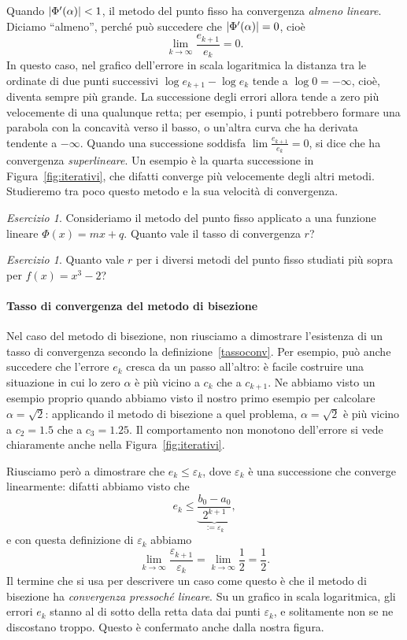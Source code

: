 \documentclass[a4paper]{report}
\DeclarePairedDelimiter{\abs}{\lvert}{\rvert}
\theoremstyle{definition}
\theoremstyle{remark}
\newtheorem{esercizio}[theorem]{Esercizio}
\begin{document}
Quando $\abs{\Phi'(\alpha)}<1$, il metodo del punto fisso ha convergenza \emph{almeno lineare}. Diciamo ``almeno'', perché può succedere che $\abs{\Phi'(\alpha)} = 0$, cioè
\[
    \lim_{k\to\infty} \frac{e_{k+1}}{e_k} = 0.
\]
In questo caso, nel grafico dell'errore in scala logaritmica la distanza tra le ordinate di due punti successivi $\log e_{k+1} - \log e_k$ tende a $\log 0 = -\infty$, cioè, diventa sempre più grande. La successione degli errori allora tende a zero più velocemente di una qualunque retta; per esempio, i punti potrebbero formare una parabola con la concavità verso il basso, o un'altra curva che ha derivata tendente a $-\infty$. Quando una successione soddisfa $\lim \frac{e_{k+1}}{e_k} = 0$, si dice che ha convergenza \emph{superlineare}. Un esempio è la quarta successione in Figura~\ref{fig:iterativi}, che difatti converge più velocemente degli altri metodi. Studieremo tra poco questo metodo e la sua velocità di convergenza.

\begin{esercizio}
    Consideriamo il metodo del punto fisso applicato a una funzione lineare $\Phi(x) = mx + q$. Quanto vale il tasso di convergenza $r$?
\end{esercizio}
\begin{esercizio}
    Quanto vale $r$ per i diversi metodi del punto fisso studiati più sopra per $f(x) = x^3 - 2$?
\end{esercizio}

\paragraph{Tasso di convergenza del metodo di bisezione}
Nel caso del metodo di bisezione, non riusciamo a dimostrare l'esistenza di un tasso di convergenza secondo la definizione~\eqref{tassoconv}. Per esempio, può anche succedere che l'errore $e_k$ cresca da un passo all'altro: è facile costruire una situazione in cui lo zero $\alpha$ è più vicino a $c_k$ che a $c_{k+1}$. Ne abbiamo visto un esempio proprio quando abbiamo visto il nostro primo esempio per calcolare $\alpha=\sqrt{2}$: applicando il metodo di bisezione a quel problema, $\alpha=\sqrt{2}$ è più vicino a $c_2=1.5$ che a $c_3=1.25$. Il comportamento non monotono dell'errore si vede chiaramente anche nella Figura~\ref{fig:iterativi}.

Riusciamo però a dimostrare che $e_k \leq \varepsilon_k$, dove $\varepsilon_k$ è una successione che converge linearmente: difatti abbiamo visto che
\[
e_k \leq \underbrace{\frac{b_0 - a_0}{2^{k+1}}}_{:=\varepsilon_k},
\]
e con questa definizione di $\varepsilon_k$ abbiamo
\[
\lim_{k\to\infty} \frac{\varepsilon_{k+1}}{\varepsilon_k} = \lim_{k\to\infty} \frac{1}{2} = \frac{1}{2}.
\]
Il termine che si usa per descrivere un caso come questo è che il metodo di bisezione ha \emph{convergenza pressoché lineare}. Su un grafico in scala logaritmica, gli errori $e_k$ stanno al di sotto della retta data dai punti $\varepsilon_k$, e solitamente non se ne discostano troppo. Questo è confermato anche dalla nostra figura.
\end{document}
